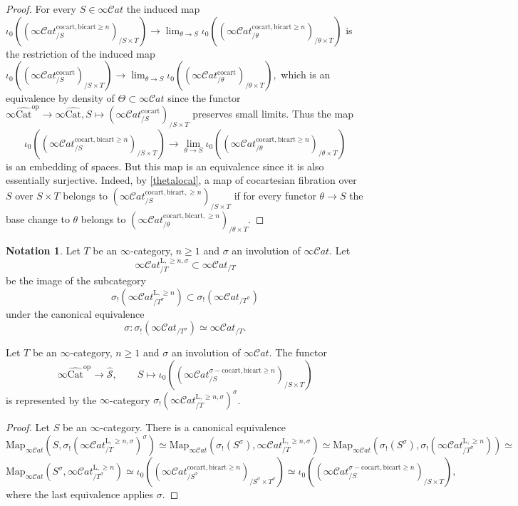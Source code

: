 \documentclass[10pt,oneside]{article}
\numberwithin{equation}{section} %
\numberwithin{figure}{section} %
\theoremstyle{plain}
\theoremstyle{definition}
\newtheorem{notation}[thm]{Notation}
\newcommand{\mS}{{\mathcal S}}
\newcommand{\op}{\mathrm{op}}
\newcommand{\Cat}{\mathrm{Cat}}
\newcommand{\cocart}{{\mathrm{cocart}}}
\newcommand{\bicart}{{\mathrm{bicart}}}
\newcommand{\Map}{{\mathrm{Map}}}
\newcommand{\scat}{\mathcal{C}\mathit{at}}
\begin{document}
\begin{proof}
For every $S \in \infty\scat$ the induced map
$\iota_0((\infty\scat^{\cocart, \bicart\geq n}_{/S})_{/ S \times T}) \to \lim_{\theta \to S}\iota_0((\infty\scat^{\cocart, \bicart\geq n}_{/\theta})_{/ \theta \times T}) $
is the restriction of the induced map 
$\iota_0((\infty\scat^{\cocart}_{/S})_{/ S \times T}) \to \lim_{\theta \to S}\iota_0((\infty\scat^{\cocart}_{/\theta})_{/ \theta \times T}),$ which is an equivalence by density of $\Theta \subset \infty\scat$
since the functor $\infty\widehat{\Cat}^\op \to \infty\widehat{\Cat}, S \mapsto (\infty\scat^{\cocart}_{/S})_{/ S \times T} $ preserves small limits.
Thus the map $$\iota_0((\infty\scat^{\cocart, \bicart\geq n}_{/S})_{/ S \times T}) \to \lim_{\theta \to S}\iota_0((\infty\scat^{\cocart, \bicart\geq n}_{/\theta})_{/ \theta \times T}) $$ is an embedding of spaces.
But this map is an equivalence since it is also essentially surjective.
Indeed, by \cref{thetalocal}, a map of cocartesian fibration over
$S$ over $S \times T$ belongs to $(\infty\scat^{\cocart, \bicart,\geq n}_{/S})_{/ S \times T}$
if for every functor $\theta \to S$ the base change to $\theta$
belongs to $(\infty\scat^{\cocart, \bicart,\geq n}_{/\theta})_{/ \theta \times T}.$
\end{proof}

\begin{notation}Let $T$ be an $\infty$-category, $ n \geq 1$ and $\sigma$ an involution of $\infty\scat.$
Let $$\infty\scat_{/T}^{\mathrm{L},\geq n, \sigma} \subset \infty\scat_{/T}$$ be the image of
the subcategory $$\sigma_!(\infty\scat^{\mathrm{L},\geq n}_{/T^\sigma}) \subset \sigma_!(\infty\scat_{/T^\sigma}) $$
under the canonical equivalence
$$ \sigma: \sigma_!(\infty\scat_{/T^\sigma}) \simeq \infty\scat_{/T}. $$
\end{notation}

\begin{corollary}\label{Grobica2}Let $T$ be an $\infty$-category, $ n \geq 1$ and $\sigma$ an involution of $\infty\scat.$
The functor $$ \infty\widehat{\Cat}^\op \to \widehat{\mS},\qquad S \mapsto \iota_0((\infty\scat_{/S}^{\sigma-\cocart, \bicart \geq n})_{/S \times T}) $$ is represented by the $\infty$-category $\sigma_!(\infty\scat^{\mathrm{L},\geq n, \sigma}_{/T})^\sigma $.

\end{corollary}

\begin{proof}Let $S$ be an $\infty$-category.
There is a canonical equivalence
$$ \Map_{\infty\scat}(S,\sigma_!(\infty\scat^{\mathrm{L},\geq n, \sigma}_{/T})^\sigma) \simeq \Map_{\infty\scat}(\sigma_!(S^\sigma),\infty\scat_{/T}^{\mathrm{L},\geq n, \sigma}) \simeq \Map_{\infty\scat}(\sigma_!(S^\sigma), \sigma_!(\infty\scat_{/T^\sigma}^{\mathrm{L},\geq n})) \simeq $$$$ \Map_{\infty\scat}(S^\sigma, \infty\scat_{/T^\sigma}^{\mathrm{L},\geq n}) \simeq \iota_0((\infty\scat_{/S^\sigma}^{\cocart, \bicart\geq n})_{/ S^\sigma \times T^\sigma}) \simeq \iota_0((\infty\scat_{/S}^{\sigma-\cocart, \bicart \geq n})_{/S \times T}),$$
where the last equivalence applies $\sigma.$
\end{proof}
\end{document}
